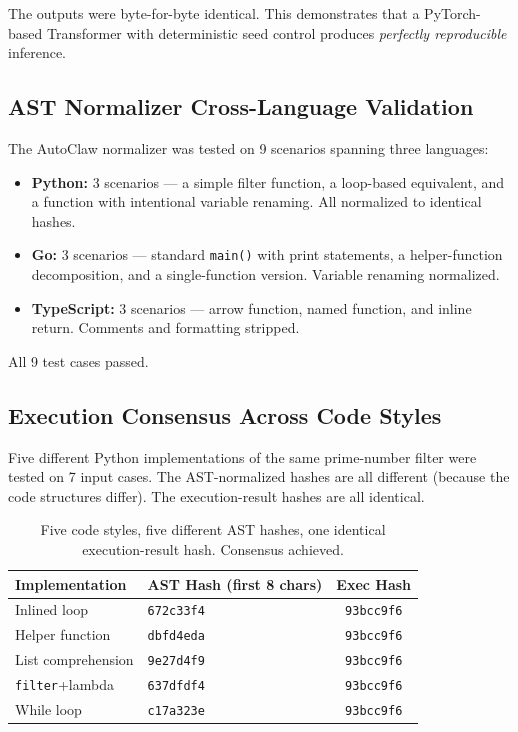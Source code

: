 \documentclass[11pt,a4paper]{article}
\begin{document}
The outputs were byte-for-byte identical. This demonstrates that a
PyTorch-based Transformer with deterministic seed control produces
\emph{perfectly reproducible} inference.

\subsection{AST Normalizer Cross-Language Validation}

The AutoClaw normalizer was tested on 9 scenarios spanning three
languages:

\begin{itemize}
    \item \textbf{Python:} 3 scenarios --- a simple filter function,
          a loop-based equivalent, and a function with intentional
          variable renaming. All normalized to identical hashes.
    \item \textbf{Go:} 3 scenarios --- standard \texttt{main()} with
          print statements, a helper-function decomposition, and a
          single-function version. Variable renaming normalized.
    \item \textbf{TypeScript:} 3 scenarios --- arrow function, named
          function, and inline return. Comments and formatting stripped.
\end{itemize}

All 9 test cases passed.

\subsection{Execution Consensus Across Code Styles}

Five different Python implementations of the same prime-number filter
were tested on 7 input cases. The AST-normalized hashes are all
different (because the code structures differ). The execution-result
hashes are all identical.

\begin{table}[h]
\centering
\begin{tabular}{llc}
\toprule
Implementation & AST Hash (first 8 chars) & Exec Hash \\
\midrule
Inlined loop   & \texttt{672c33f4}          & \texttt{93bcc9f6} \\
Helper function & \texttt{dbfd4eda}         & \texttt{93bcc9f6} \\
List comprehension & \texttt{9e27d4f9}      & \texttt{93bcc9f6} \\
\texttt{filter}+lambda & \texttt{637dfdf4}  & \texttt{93bcc9f6} \\
While loop     & \texttt{c17a323e}          & \texttt{93bcc9f6} \\
\bottomrule
\end{tabular}
\caption{\label{tab:exec-consensus} Five code styles, five different AST
hashes, one identical execution-result hash. Consensus achieved.}
\end{table}
\end{document}
